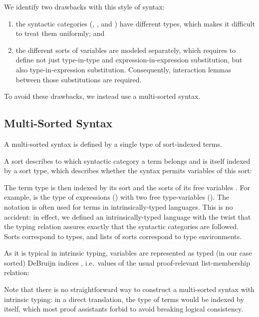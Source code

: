 \documentclass[a4paper, UKenglish, cleveref, autoref, thm-restate]{lipics-v2021}
\newenvironment{LibCode*}{%
  \begin{tcolorbox}[%
    colframe=white,%
    boxrule=0.0pt,%
    top=2.5pt,%
    left=2.5pt,%
    bottom=2.5pt,%
    right=2.5pt,%
    boxsep=0pt%
  ]\vspace{-0.2\baselineskip}%
}{%
  \vspace{-1\baselineskip}%
  \end{tcolorbox}%
}
\newcommand*\LibCode[1]{\begin{LibCode*}{#1}\end{LibCode*}}
\newcommand*\AppCode[1]{{#1}}
\newcommand*\ACode[1]{\AgdaFontStyle{\textcolor{mygray}{#1}}}
\newcommand*\ACon[1]{\AgdaInductiveConstructor{#1}}
\begin{document}
  We identify two drawbacks with this style of syntax:
  \begin{enumerate}
  \item
    the syntactic categories (\ACode{\ACon{Kind}},
    \ACode{\ACon{Type}}, and \ACode{\ACon{Expr}})
    have different types, which makes it difficult to treat them uniformly; and
  \item the different sorts of variables are modeled separately, which requires to define not just
    type-in-type and expression-in-expression substitution, but also type-in-expression substitution.
    Consequently, interaction lemmas between those substitutions are required.
  \end{enumerate}
  To avoid these drawbacks, we instead use a multi-sorted syntax.

  \subsection{Multi-Sorted Syntax}
  \label{sec:syntax:multi}
  A multi-sorted syntax is defined by a single type of sort-indexed terms.

  A sort describes to which syntactic category a term belongs and is
  itself indexed by a sort type, which describes whether the syntax
  permits variables of this sort:
  \LibCode\KSortTy
  \AppCode\FSort
  
  The term type \ACode{S \ACon{⊢} s} is then indexed by its sort
  \ACode{s} and the sorts of its free variables \ACode{S}.
  For example, \ACode{\ACon{[𝕥, 𝕥] ⊢ 𝕖}} is the type of expressions
  (\ACode{\ACon{𝕖}}) with two free type-variables (\ACode{\ACon{𝕥}}).
  \AppCode\FSyntax
  The notation \ACode{\ACon{\_⊢\_}} is often used for terms in
  intrinsically-typed languages. This is no accident: in effect, we
  defined an intrinsically-typed language with the twist that the
  typing relation assures exactly that the syntactic categories are followed.
  Sorts \ACode{s} correspond to types, and lists of sorts \ACode{S}
  correspond to type environments.

  As it is typical in intrinsic typing, variables are represented as
  typed (in our case sorted) DeBruijn indices \ACode{S \ACon{∋} s}, i.e.\
  values of the usual proof-relevant list-membership relation:
  \LibCode\KVariables

  Note that there is no straightforward way to construct a
  multi-sorted syntax with intrinsic typing: in a direct translation,
  the type of terms \ACode{\ACon{\_⊢\_}} would be indexed by itself, which
  most proof assistants forbid to avoid breaking logical consistency.
\end{document}
